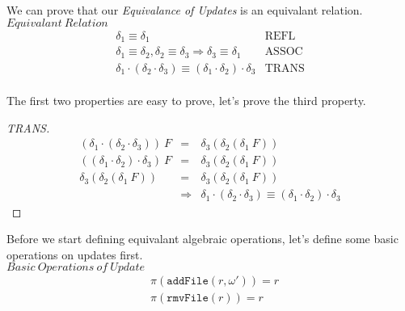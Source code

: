 \documentclass[10pt,twoside,a4paper]{article}
\theoremstyle{theorem}
\theoremstyle{lemma}
\theoremstyle{property}
\theoremstyle{definition}
\theoremstyle{assumption}
\begin{document}
We can prove that our \emph{Equivalance of Updates} is an equivalant relation.\\

$\boxed{Equivalant~Relation}$
\begin{displaymath}
\begin{array}{ll}
	\delta_1 \equiv \delta_1 & \textrm{REFL} \\
	\delta_1 \equiv \delta_2, \delta_2 \equiv \delta_3 \Rightarrow \delta_3 \equiv \delta_1 & \textrm{ASSOC} \\
	\delta_1 \cdot (\delta_2 \cdot \delta_3) \equiv (\delta_1 \cdot \delta_2) \cdot \delta_3 & \textrm{TRANS}
\end{array}
\end{displaymath}\\

The first two properties are easy to prove, let's prove the third property.

\begin{proof}[TRANS]

\begin{eqnarray*}
	(\delta_1 \cdot (\delta_2 \cdot \delta_3)) ~F & = & \delta_3 (\delta_2 (\delta_1 ~F)) \\
	((\delta_1 \cdot \delta_2) \cdot \delta_3) ~F & = & \delta_3 (\delta_2 (\delta_1 ~F)) \\
	\delta_3 (\delta_2 (\delta_1 ~F)) & = & \delta_3 (\delta_2 (\delta_1 ~F)) \\
	& \Rightarrow & \delta_1 \cdot (\delta_2 \cdot \delta_3) \equiv (\delta_1 \cdot \delta_2) \cdot \delta_3
\end{eqnarray*}
\end{proof}

Before we start defining equivalant algebraic operations, let's define some basic operations on updates first.\\

$\boxed{Basic~Operations ~of ~Update}$
\begin{align*}
	& \pi(\mathtt{addFile}(r,\omega')) = r\\
	& \pi(\mathtt{rmvFile}(r)) = r
\end{align*}
\end{document}
